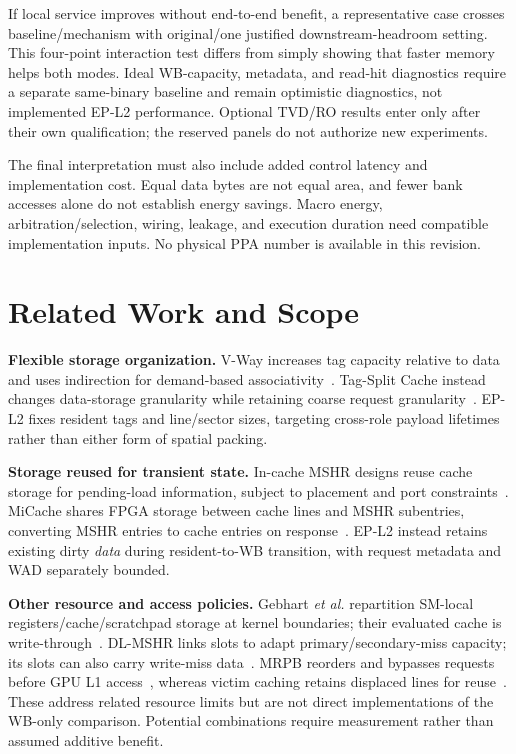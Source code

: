 \documentclass[conference,letterpaper]{IEEEtran}
\newcommand{\epl}{EP-L2}
\begin{document}
If local service improves without end-to-end benefit, a representative case crosses baseline/mechanism with original/one justified downstream-headroom setting. This four-point interaction test differs from simply showing that faster memory helps both modes. Ideal WB-capacity, metadata, and read-hit diagnostics require a separate same-binary baseline and remain optimistic diagnostics, not implemented \epl{} performance. Optional TVD/RO results enter only after their own qualification; the reserved panels do not authorize new experiments.

The final interpretation must also include added control latency and implementation cost. Equal data bytes are not equal area, and fewer bank accesses alone do not establish energy savings. Macro energy, arbitration/selection, wiring, leakage, and execution duration need compatible implementation inputs. No physical PPA number is available in this revision.

\section{Related Work and Scope}
\textbf{Flexible storage organization.} V-Way increases tag capacity relative to data and uses indirection for demand-based associativity~\cite{vway}. Tag-Split Cache instead changes data-storage granularity while retaining coarse request granularity~\cite{tsc}. \epl{} fixes resident tags and line/sector sizes, targeting cross-role payload lifetimes rather than either form of spatial packing.

\textbf{Storage reused for transient state.} In-cache MSHR designs reuse cache storage for pending-load information, subject to placement and port constraints~\cite{farkas}. MiCache shares FPGA storage between cache lines and MSHR subentries, converting MSHR entries to cache entries on response~\cite{micache}. \epl{} instead retains existing dirty \emph{data} during resident-to-WB transition, with request metadata and WAD separately bounded.

\textbf{Other resource and access policies.} Gebhart \emph{et al.} repartition SM-local registers/cache/scratchpad storage at kernel boundaries; their evaluated cache is write-through~\cite{unified}. DL-MSHR links slots to adapt primary/secondary-miss capacity; its slots can also carry write-miss data~\cite{dlmshr}. MRPB reorders and bypasses requests before GPU L1 access~\cite{mrpb}, whereas victim caching retains displaced lines for reuse~\cite{victim}. These address related resource limits but are not direct implementations of the WB-only comparison. Potential combinations require measurement rather than assumed additive benefit.
\end{document}
